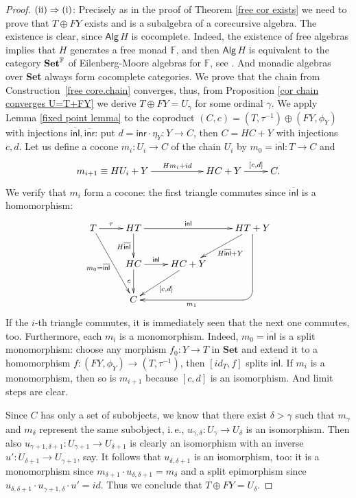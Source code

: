 \documentclass{LMCS}
\theoremstyle{plain}
\theoremstyle{definition}
\numberwithin{equation}{section}
\begin{document}
\begin{proof}
\smallskip
\noindent
${\rm (ii)\Rightarrow(i)}$: Precisely as in the proof of Theorem \ref{free cor exists} we need to prove that $T\oplus FY$ exists and is a subalgebra of a corecursive algebra. The existence is clear, since $\mathsf{Alg}\,H$ is cocomplete. Indeed, the existence of free algebras implies that $H$ generates a free monad $\mathbb{F}$, and then $\mathsf{Alg}\,H$ is equivalent to the category ${\bf Set}^{\mathbb F}$ of Eilenberg-Moore algebras for $\mathbb F$, see \cite{b}. And monadic algebras over {\bf Set} always form cocomplete categories.
We prove that the chain from Construction~\ref{free core.chain}
converges, thus, from Proposition \ref{cor chain converges U=T+FY} we
derive $T\oplus FY=U_\gamma$ for some ordinal $\gamma$. We apply Lemma
\ref{fixed point lemma} to the coproduct
$(C,c)=(T,\tau^{-1})\oplus(FY,\phi_Y)$ with injections
$\overline{\mathsf{inl}}, \overline {\mathsf{inr}}$: put
$d=\mathsf{inr}\cdot \eta_Y:Y\to C$, then $C=HC+Y$ with injections
$c,d$. Let us define a cocone $m_i:U_i\to C$ of the chain $U_i$ by $m_0=\overline{\mathsf{inl}}:T\to C$ and
$$\xymatrix{
m_{i+1}\equiv HU_i+Y\ar[rr]^-{Hm_i+id}&&HC+Y\ar[r]^-{[c,d]}&C.
}$$
We verify that $m_i$ form a cocone: the first triangle commutes since $\overline {\mathsf{inl}}$ is a homomorphism:
$$
\xymatrix{
  T
  \ar[r]^-{\tau}
  \ar[ddr]_-{m_0=\overline{\mathsf{inl}}}
  &
  HT
  \ar[rr]^-{\mathsf{inl}}
  \ar[d]_-{H\overline{\mathsf{inl}}}
  &&
  HT+Y
  \ar[ld]^-{H\overline{\mathsf{inl}}+Y}
  \ar `d[dd] [ddll]^-{m_1}
  \\
  &
  HC\ar[r]^-{\mathsf{inl}}\ar[d]_-c&HC+Y\ar[ld]^-{[c,d]}
  \\
  &
  C && }
$$
If the $i$-th triangle commutes, it is immediately seen that
the next one commutes, too. Furthermore, each $m_i$ is a monomorphism. Indeed,
$m_0=\overline{\mathsf{inl}}$ is a split monomorphism: choose any
morphism $f_0:Y\to T$ in $\mathbf {Set}$ and extend it to a homomorphism
$f:(FY,\phi_Y)\to (T,\tau^{-1})$, then $[id_T,f]$ splits
$\overline{\mathsf{inl}}$. If $m_i$ is a monomorphism, then so is
$m_{i+1}$ because $[c,d]$ is an isomorphism. And limit steps are clear.

Since $C$ has only a set of subobjects, we know that there exist $\delta > \gamma$ such that $m_\gamma$ and $m_\delta$ represent the same subobject, i.\,e., $u_{\gamma,\delta}: U_\gamma \to U_\delta$ is an isomorphism. Then also $u_{\gamma+1,\delta+1}: U_{\gamma+1} \to U_{\delta+1}$ is clearly an isomorphism with an inverse $u': U_{\delta+1} \to U_{\gamma+1}$, say. It follows that $u_{\delta, \delta+1}$ is an isomorphism, too: it is a monomorphism since $m_{\delta+1} \cdot u_{\delta,\delta+1} = m_\delta$ and a split epimorphism since
$
u_{\delta, \delta+1} \cdot u_{\gamma+1,\delta} \cdot u' = id. 
$
Thus we conclude that $T\oplus FY=U_\delta$.


\end{proof}
\end{document}
